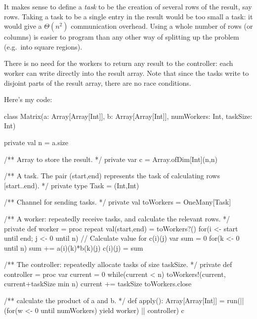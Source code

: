 \begin{answer}
It makes sense to define a \emph{task} to be the creation of several rows of
the result, say  rows.  
Taking a task to be a single entry in the result would be too small a task: it
would give a $\Theta(n^2)$ communication overhead.  Using a whole number of
rows (or columns) is easier to program than any other way of splitting up the
problem (e.g.\ into square regions).

There is no need for the workers to return any result to the controller: each
worker can write directly into the result array.  Note that since the tasks
write to disjoint parts of the result array, there are no race conditions. 

Here's my code:
%
\begin{scala}
class Matrix(a: Array[Array[Int]], b: Array[Array[Int]], numWorkers: Int, taskSize: Int){
  private val n = a.size

  /** Array to store the result. */
  private var c = Array.ofDim[Int](n,n)

  /** A task.  The pair (start,end) represents the task of calculating rows [start..end). */
  private type Task = (Int,Int) 

  /** Channel for sending tasks. */
  private val toWorkers = OneMany[Task]

  /** A worker: repeatedly receive tasks, and calculate the relevant rows. */
  private def worker = proc{
    repeat{
      val(start,end) = toWorkers?()
      for(i <- start until end; j <- 0 until n){
	// Calculate value for c(i)(j)
	var sum = 0
	for(k <- 0 until n) sum += a(i)(k)*b(k)(j)
	c(i)(j) = sum
      }
    }
  }

  /** The controller: repeatedly allocate tasks of size taskSize. */
  private def controller = proc{
    var current = 0
    while(current < n){
      toWorkers!(current, current+taskSize min n)
      current += taskSize
    }
    toWorkers.close
  }

  /** calculate the product of a and b. */
  def apply(): Array[Array[Int]] = {
    run(|| (for(w <- 0 until numWorkers) yield worker) || controller)
    c
  }
}
\end{scala}


\end{answer}
